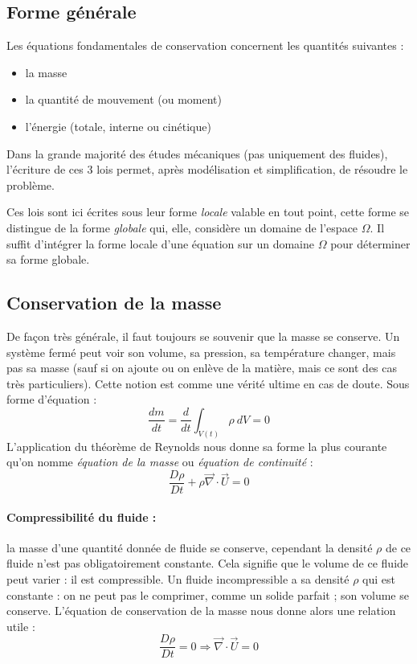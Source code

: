 
\subsection{Forme générale}
Les équations fondamentales de conservation concernent les quantités suivantes :
%
\begin{itemize}
    \item la masse
    \item la quantité de mouvement (ou moment)
    \item l'énergie (totale, interne ou cinétique)
\end{itemize}

Dans la grande majorité des études mécaniques (pas uniquement des fluides), l'écriture de ces 3 lois permet, après modélisation et simplification, de résoudre le problème.

Ces lois sont ici écrites sous leur forme \textit{locale} valable en tout point, cette forme se distingue de la forme \textit{globale} qui, elle, considère un domaine de l'espace $\Omega$. Il suffit d'intégrer la forme locale d'une équation sur un domaine $\Omega$ pour déterminer sa forme globale.


\subsection{Conservation de la masse}
De façon très générale, il faut toujours se souvenir que la masse se conserve. Un système fermé peut voir son volume, sa pression, sa température changer, mais pas sa masse (sauf si on ajoute ou on enlève de la matière, mais ce sont des cas très particuliers). Cette notion est comme une vérité ultime en cas de doute. Sous forme d'équation :
%
\begin{equation}
    \frac{dm}{dt} = \frac{d}{dt} \int_{V(t)} {\rho~dV} = 0
\end{equation}
%
L'application du théorème de Reynolds nous donne sa forme la plus courante qu'on nomme \textit{équation de la masse} ou \textit{équation de continuité} :
%
\begin{equation}
    \frac {D\rho}{Dt} + \rho \vec{\nabla} \cdot \vec{U} = 0
    \label{eq:masse}
\end{equation}
%
\paragraph{Compressibilité du fluide :} la masse d'une quantité donnée de fluide se conserve, cependant la densité $\rho$ de ce fluide n'est pas obligatoirement constante. Cela signifie que le volume de ce fluide peut varier : il est compressible. Un fluide incompressible a sa densité $\rho$ qui est constante : on ne peut pas le comprimer, comme un solide parfait ; son volume se conserve. L'équation de conservation de la masse nous donne alors une relation utile :
%
\begin{equation}
    \frac {D\rho}{Dt} = 0 \Rightarrow \vec{\nabla} \cdot \vec{U} = 0
\end{equation}



